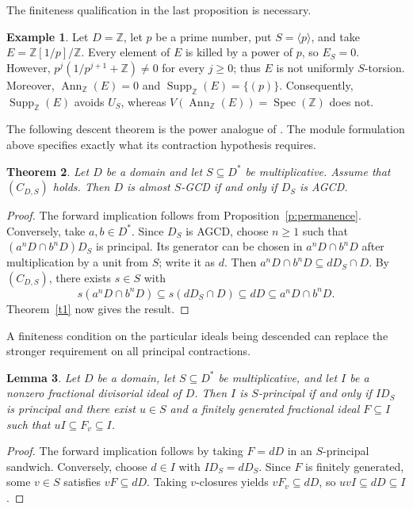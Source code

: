 \documentclass[11pt]{amsart}
\newtheorem{theorem}{Theorem}[section]
\newtheorem{lemma}[theorem]{Lemma}
\theoremstyle{definition}
\newtheorem{example}[theorem]{Example}
\theoremstyle{remark}
\DeclareMathOperator{\Spec}{Spec}
\DeclareMathOperator{\Ann}{Ann}
\DeclareMathOperator{\Supp}{Supp}
\newcommand{\ZZ}{\mathbb Z}
\begin{document}
The finiteness qualification in the last proposition is necessary.

\begin{example}\label{e:unbounded-torsion}
Let $D=\ZZ$, let $p$ be a prime number, put
$S=\langle p\rangle$, and take $E=\ZZ[1/p]/\ZZ$.
Every element of $E$ is killed by a power of $p$, so $E_S=0$.
However, $p^j(1/p^{j+1}+\ZZ)\neq0$ for every $j\geq0$;
thus $E$ is not uniformly $S$-torsion. Moreover,
$\Ann_{\ZZ}(E)=0$ and $\Supp_{\ZZ}(E)=\{(p)\}$.
Consequently, $\Supp_{\ZZ}(E)$ avoids $U_S$, whereas
$V(\Ann_{\ZZ}(E))=\Spec(\ZZ)$ does not.
\end{example}

The following descent theorem is the power analogue of
\cite[Theorem~2.3]{AHZ}. The module formulation above specifies
exactly what its contraction hypothesis requires.

\begin{theorem}\label{t3}
Let $D$ be a domain and let $S\subseteq D^\ast$ be multiplicative.
Assume that $(C_{D,S})$ holds. Then $D$ is almost $S$-GCD if and
only if $D_S$ is AGCD.
\end{theorem}

\begin{proof}
The forward implication follows from Proposition~\ref{p:permanence}.
Conversely, take $a,b\in D^\ast$. Since $D_S$ is AGCD, choose
$n\geq1$ such that $(a^nD\cap b^nD)D_S$ is principal.
Its generator can be chosen in $a^nD\cap b^nD$ after multiplication
by a unit from $S$; write it as $d$. Then
$a^nD\cap b^nD\subseteq dD_S\cap D$.
By $(C_{D,S})$, there exists $s\in S$ with
\[
s(a^nD\cap b^nD)\subseteq s(dD_S\cap D)
\subseteq dD\subseteq a^nD\cap b^nD.
\]
Theorem~\ref{t1} now gives the result.
\end{proof}

A finiteness condition on the particular ideals being descended can
replace the stronger requirement on all principal contractions.

\begin{lemma}\label{l:finite-obstruction}
Let $D$ be a domain, let $S\subseteq D^\ast$ be multiplicative,
and let $I$ be a nonzero fractional divisorial ideal of $D$.
Then $I$ is $S$-principal if and only if $ID_S$ is principal and
there exist $u\in S$ and a finitely generated fractional ideal
$F\subseteq I$ such that $uI\subseteq F_v\subseteq I$.
\end{lemma}

\begin{proof}
The forward implication follows by taking $F=dD$ in an
$S$-principal sandwich. Conversely, choose $d\in I$ with
$ID_S=dD_S$. Since $F$ is finitely generated, some $v\in S$
satisfies $vF\subseteq dD$. Taking $v$-closures yields
$vF_v\subseteq dD$, so $uvI\subseteq dD\subseteq I$.
\end{proof}
\end{document}

